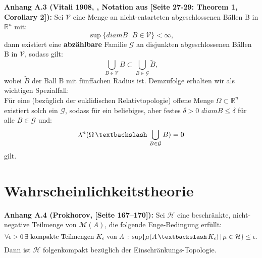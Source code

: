 \documentclass[
	language=german, %
	type=master, %
]{isthesis}
\begin{document}
\begin{appendix}
\colorbox{generalYellow}{\begin{minipage}{16cm}{\textcolor{black}{}{\label{theoA.3}}}
\textbf{Anhang A.3 (Vitali 1908, \cite{zbMATH02639907}, Notation aus \cite{EvansMeaTh}[Seite 27-29: Theorem 1, Corollary 2]):} Sei \(\mathcal{V}\) eine Menge an nicht-entarteten abgeschlossenen Bällen B in \(\mathbb{R}^n\) mit:
\begin{equation}
    \sup \{diam B \, | \, B \in \mathcal{V}\} < \infty,
\end{equation}
dann existiert eine \textbf{abzählbare} Familie \(\mathcal{G}\) an disjunkten abgeschlossenen Bällen B in \(\mathcal{V}\), sodass gilt:
\begin{equation}
    \bigcup_{B \in \mathcal{V}} B \subset \bigcup_{B \in \mathcal{G}} \tilde{B},
\end{equation}
wobei \(\tilde{B}\) der Ball B mit fünffachen Radius ist. Demzufolge erhalten wir als wichtigen Spezialfall:\\
Für eine (bezüglich der euklidischen Relativtopologie) offene Menge \(\Omega \subset \mathbb{R}^n\) existiert solch ein \(\mathcal{G}\), sodass für ein beliebiges, aber festes \(\delta > 0\) \(diam B \leq \delta\) für alle \(B \in \mathcal{G}\) und:
\begin{equation}
    \lambda^n(\Omega \, \textbackslash \, \bigcup_{B \in \mathcal{G}} B) = 0
\end{equation}
gilt.
\end{minipage}}
\newpage
        \section{Wahrscheinlichkeitstheorie}
\colorbox{generalYellow}{\begin{minipage}{16cm}{\textcolor{black}{}{\label{theoA.4}}}
\textbf{Anhang A.4 (Prokhorov, \cite{prokRand}[Seite 167--170]):} Sei \(\mathcal{H}\) eine beschränkte, nicht-negative Teilmenge von \(\mathcal{M}(A)\), die folgende Enge-Bedingung erfüllt:
\begin{equation}
    \forall \epsilon > 0 \, \exists \text{ kompakte Teilmengen }K_{\epsilon} \text{ von }A \, : \, \sup\{\mu (A \, \textbackslash \, K_{\epsilon}) \, | \, \mu \in \mathcal{H}\} \leq \epsilon. 
\end{equation}
Dann ist \(\mathcal{H}\) folgenkompakt bezüglich der Einschränkungs-Topologie.
\end{minipage}}\\


\end{appendix}
\end{document}
